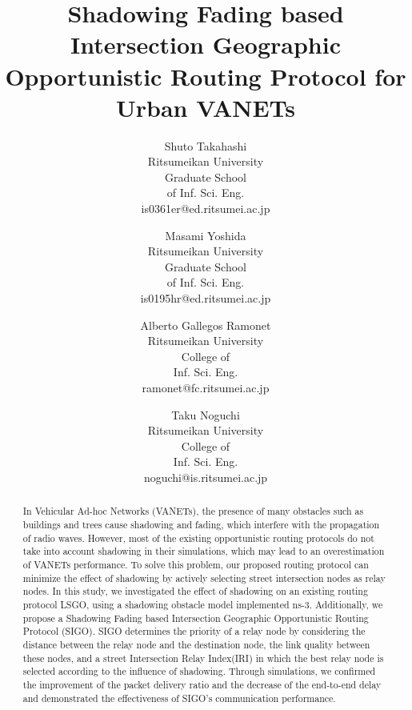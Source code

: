\documentclass[conference]{IEEEtran}
\begin{document}
\title{Shadowing Fading based Intersection Geographic Opportunistic Routing Protocol for Urban VANETs
}

\author{
    Shuto Takahashi\\
    Ritsumeikan University\\
    Graduate School\\
    of Inf. Sci. Eng.\\
    is0361er@ed.ritsumei.ac.jp
  \and
    Masami Yoshida\\
    Ritsumeikan University\\
    Graduate School\\
    of Inf. Sci. Eng.\\
    is0195hr@ed.ritsumei.ac.jp
    \and
    Alberto Gallegos Ramonet\\
    Ritsumeikan University\\
    College of\\
    Inf. Sci. Eng.\\
    ramonet@fc.ritsumei.ac.jp
    \and
    Taku Noguchi\\
    Ritsumeikan University\\
    College of\\
    Inf. Sci. Eng.\\
    noguchi@is.ritsumei.ac.jp
}


\maketitle

\begin{abstract}

In Vehicular Ad-hoc Networks (VANETs), the presence of many obstacles such as buildings and trees cause shadowing and fading, which interfere with the propagation of radio waves.  However, most of the existing opportunistic routing protocols do not take into account shadowing in  their simulations, which may lead to an overestimation of VANETs performance. 
To solve this problem, our proposed routing protocol can minimize the effect of shadowing by actively selecting street intersection nodes as relay nodes. In this study, we investigated the effect of shadowing on an existing routing protocol LSGO, using a shadowing obstacle model implemented ns-3.
Additionally, we propose a Shadowing Fading  based Intersection Geographic Opportunistic Routing Protocol (SIGO). 
SIGO determines the priority of a relay node by considering the distance between the relay node and the destination node, the link quality between these nodes, and a street Intersection Relay Index(IRI) in which the best relay node is selected according to the influence of shadowing.
Through simulations, we confirmed the improvement of the packet delivery ratio and the decrease of the end-to-end delay and demonstrated the effectiveness of SIGO's communication performance.
\end{abstract}
\end{document}
